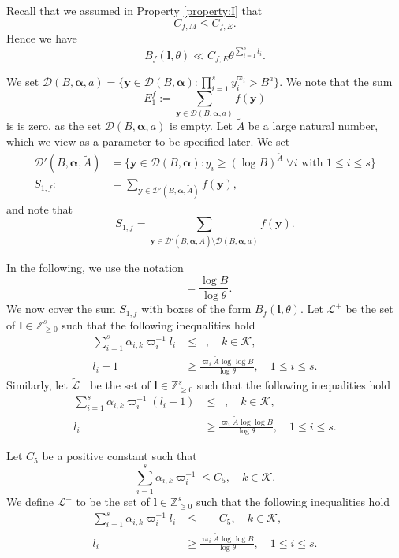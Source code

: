 \documentclass[11pt]{article}
\numberwithin{equation}{section}
\DeclareMathOperator{\LBt}{\mathit{L(B,\theta)}}
\newcommand{\cD}{\mathcal{D}}
\newcommand{\cBalp}{\cD(B,\bfalp)}
\newcommand{\cBalpa}{\cD(B,\bfalp,a)}
\newcommand{\cBalpA}{\cD'(B,\bfalp,\tilde A)}
\let\tet\theta
\newcommand{\bfy}{\boldsymbol{y}}
\newcommand{\bfalp}{\boldsymbol{\alpha}}
\newcommand{\bfl}{\boldsymbol{l}}
\newcommand{\calK}{\mathcal{K}}
\newcommand{\calL}{\mathcal{L}}
\newcommand{\Z}{\mathbb{Z}}
\theoremstyle{definition}
\numberwithin{theorem}{section}
\begin{document}
Recall that we assumed in Property \ref{property:I} that
\begin{equation*}
C_{f,M}\leq C_{f,E}.
\end{equation*}
Hence we have
\begin{equation}\label{eqn22}
B_f(\bfl,\tet)\ll C_{f,E} \tet^{\sum_{i=1}^s l_i}.
\end{equation}

We set $\cBalpa=\{\bfy\in\cBalp:\prod_{i=1}^sy_i^{\varpi_i}>B^a\}$. We note that the sum
\[
E_1^f:= \sum_{\bfy\in\cBalpa}f(\bfy)
\]
is is zero, as the set $\cBalpa$ is empty.
Let $\tilde{A}$ be a large natural number, which we view as a parameter to be specified later.
We set
\begin{align*}
\cBalpA&=\bigl\{\bfy\in\cBalp:y_i\geq(\log B)^{\tilde{A}}\; \forall i \text{ with }1\leq i\leq s\bigr\}\\
\tag*{and}
S_{1,f}:\!&= \sum_{\bfy\in \cBalpA}f(\bfy),
\end{align*}
and note that
\[
S_{1,f}= \sum_{\bfy\in \cBalpA\setminus\cBalpa}f(\bfy).
\]

In the following, we use the notation
\[\LBt=\frac{\log B}{\log\theta}.\]
We now cover the sum $S_{1,f}$ with boxes of the form $B_f(\bfl,\tet)$. Let $\calL^+$ be the set of $\bfl\in \Z_{\geq 0}^s$ such that the following inequalities hold
\begin{align*}
\sum_{i=1}^s \alpha_{i,k} \varpi_i^{-1}l_i&\leq \LBt,\quad k\in \calK,\\
l_i+1&\geq \frac{\varpi_i \tilde{A} \log \log B}{\log \tet},\quad 1\leq i\leq s.
\end{align*}
Similarly, let $\widetilde{\calL}^-$ be the set of $\bfl\in \Z_{\geq 0}^s$ such that the following inequalities hold
\begin{align*}
\sum_{i=1}^s \alpha_{i,k} \varpi_i^{-1}(l_i +1)&\leq \LBt,\quad k\in \calK,\\
l_i&\geq \frac{\varpi_i \tilde{A} \log \log B}{\log \tet},\quad 1\leq i\leq s.
\end{align*}

Let $C_5$ be a positive constant such that
\[
\sum_{i=1}^s \alpha_{i,k} \varpi_i^{-1}\leq C_5, \quad k\in \calK.
\]
We define $\calL^-$ to be the set of $\bfl\in \Z_{\geq 0}^s$ such that the following inequalities hold
\begin{align*}
\sum_{i=1}^s \alpha_{i,k} \varpi_i^{-1}l_i &\leq \LBt - C_5, \quad k\in \calK,\\
l_i&\geq \frac{\varpi_i \tilde{A} \log \log B}{\log \tet},\quad 1\leq i\leq s.
\end{align*}
\end{document}
